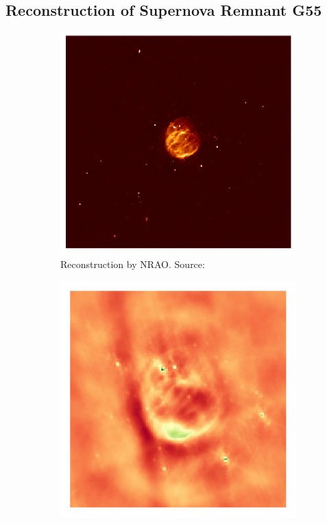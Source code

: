 \subsection{Reconstruction of Supernova Remnant G55}
\begin{figure}[h]
	\centering
	\begin{subfigure}[b]{0.45\linewidth}
		\includegraphics[width=\linewidth, trim={230px 210px 225px 200px}, clip]{./chapters/05.results/pic_G55_7.png}
		\caption{Reconstruction by NRAO.  Source:\cite{nraoG55}}
		\label{results:g55:nrao:rec}
	\end{subfigure}
	\begin{subfigure}[b]{0.45\linewidth}
		\includegraphics[width=\linewidth, trim={18px 19px 18px 18px}, clip]{./chapters/05.results/g55/raw_image.png}

\end{subfigure}
\end{figure}
